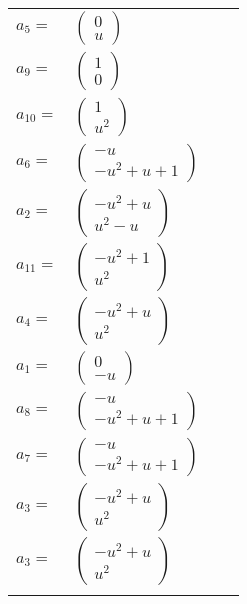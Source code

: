 \documentclass[1p]{elsarticle_modified}
\theoremstyle{definition}
\begin{document}
\begin{tabular}{m{7pt} m{180pt} m{7pt} m{180pt} }
\flushright $a_{5}=$&$\begin{pmatrix}0\\u\end{pmatrix}$ \\
\flushright $a_{9}=$&$\begin{pmatrix}1\\0\end{pmatrix}$ \\
\flushright $a_{10}=$&$\begin{pmatrix}1\\u^2\end{pmatrix}$ \\
\flushright $a_{6}=$&$\begin{pmatrix}- u\\- u^2+u+1\end{pmatrix}$ \\
\flushright $a_{2}=$&$\begin{pmatrix}- u^2+u\\u^2- u\end{pmatrix}$ \\
\flushright $a_{11}=$&$\begin{pmatrix}- u^2+1\\u^2\end{pmatrix}$ \\
\flushright $a_{4}=$&$\begin{pmatrix}- u^2+u\\u^2\end{pmatrix}$ \\
\flushright $a_{1}=$&$\begin{pmatrix}0\\- u\end{pmatrix}$ \\
\flushright $a_{8}=$&$\begin{pmatrix}- u\\- u^2+u+1\end{pmatrix}$ \\
\flushright $a_{7}=$&$\begin{pmatrix}- u\\- u^2+u+1\end{pmatrix}$ \\
\flushright $a_{3}=$&$\begin{pmatrix}- u^2+u\\u^2\end{pmatrix}$\\ \flushright $a_{3}=$&$\begin{pmatrix}- u^2+u\\u^2\end{pmatrix}$\\&\end{tabular}
\end{document}
